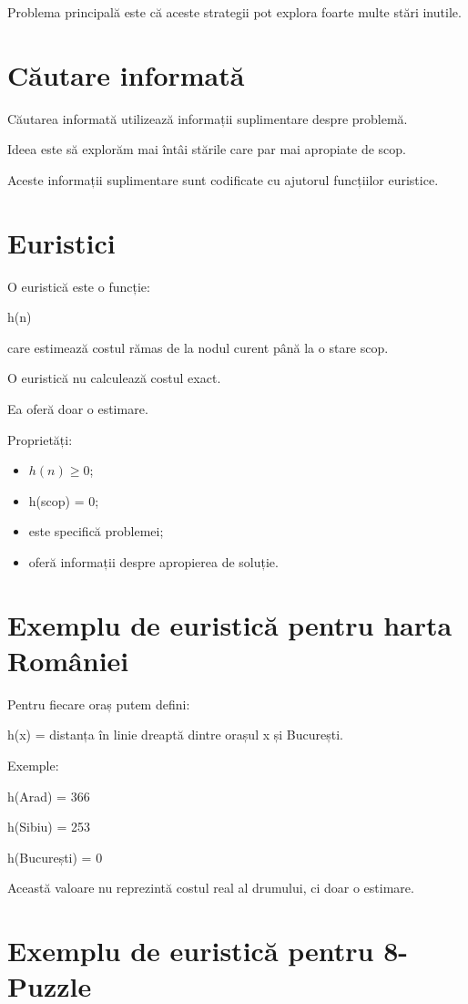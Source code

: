 \documentclass[12pt,a4paper]{article}
\begin{document}
Problema principală este că aceste strategii pot explora foarte multe stări inutile.

\section{Căutare informată}

Căutarea informată utilizează informații suplimentare despre problemă.

Ideea este să explorăm mai întâi stările care par mai apropiate de scop.

Aceste informații suplimentare sunt codificate cu ajutorul funcțiilor euristice.

\section{Euristici}

O euristică este o funcție:

h(n)

care estimează costul rămas de la nodul curent până la o stare scop.

O euristică nu calculează costul exact.

Ea oferă doar o estimare.

Proprietăți:

\begin{itemize}
\item $h(n) \ge 0$;
\item h(scop) = 0;
\item este specifică problemei;
\item oferă informații despre apropierea de soluție.
\end{itemize}

\section{Exemplu de euristică pentru harta României}

Pentru fiecare oraș putem defini:

h(x) = distanța în linie dreaptă dintre orașul x și București.

Exemple:

h(Arad) = 366

h(Sibiu) = 253

h(București) = 0

Această valoare nu reprezintă costul real al drumului, ci doar o estimare.

\section{Exemplu de euristică pentru 8-Puzzle}
\end{document}
